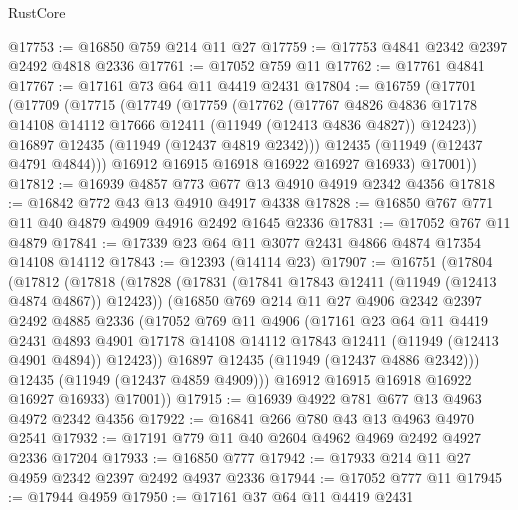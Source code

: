 \begin{lexlean}{RustCore}
\begin{coremodule}
@17753 := @16850 @759 @214 @11 @27
@17759 := @17753 @4841 @2342 @2397 @2492 @4818 @2336
@17761 := @17052 @759 @11
@17762 := @17761 @4841
@17767 := @17161 @73 @64 @11 @4419 @2431
@17804 := @16759
    (@17701
      (@17709
        (@17715
          (@17749
            (@17759
              (@17762
                (@17767
                  @4826
                  @4836
                  @17178
                  @14108
                  @14112
                  @17666
                  @12411
                  (@11949 (@12413 @4836 @4827))
                  @12423))
              @16897
              @12435
              (@11949 (@12437 @4819 @2342)))
            @12435
            (@11949 (@12437 @4791 @4844)))
          @16912
          @16915
          @16918
          @16922
          @16927
          @16933)
        @17001))
@17812 := @16939 @4857 @773 @677 @13 @4910 @4919 @2342 @4356
@17818 := @16842 @772 @43 @13 @4910 @4917 @4338
@17828 := @16850 @767 @771 @11 @40 @4879 @4909 @4916 @2492 @1645 @2336
@17831 := @17052 @767 @11 @4879
@17841 := @17339 @23 @64 @11 @3077 @2431 @4866 @4874 @17354 @14108 @14112
@17843 := @12393 (@14114 @23)
@17907 := @16751
    (@17804
      (@17812
        (@17818
          (@17828
            (@17831 (@17841 @17843 @12411 (@11949 (@12413 @4874 @4867)) @12423))
            (@16850
              @769
              @214
              @11
              @27
              @4906
              @2342
              @2397
              @2492
              @4885
              @2336
              (@17052
                @769
                @11
                @4906
                (@17161
                  @23
                  @64
                  @11
                  @4419
                  @2431
                  @4893
                  @4901
                  @17178
                  @14108
                  @14112
                  @17843
                  @12411
                  (@11949 (@12413 @4901 @4894))
                  @12423))
              @16897
              @12435
              (@11949 (@12437 @4886 @2342)))
            @12435
            (@11949 (@12437 @4859 @4909)))
          @16912
          @16915
          @16918
          @16922
          @16927
          @16933)
        @17001))
@17915 := @16939 @4922 @781 @677 @13 @4963 @4972 @2342 @4356
@17922 := @16841 @266 @780 @43 @13 @4963 @4970 @2541
@17932 := @17191 @779 @11 @40 @2604 @4962 @4969 @2492 @4927 @2336 @17204
@17933 := @16850 @777
@17942 := @17933 @214 @11 @27 @4959 @2342 @2397 @2492 @4937 @2336
@17944 := @17052 @777 @11
@17945 := @17944 @4959
@17950 := @17161 @37 @64 @11 @4419 @2431

\end{coremodule}
\end{lexlean}
